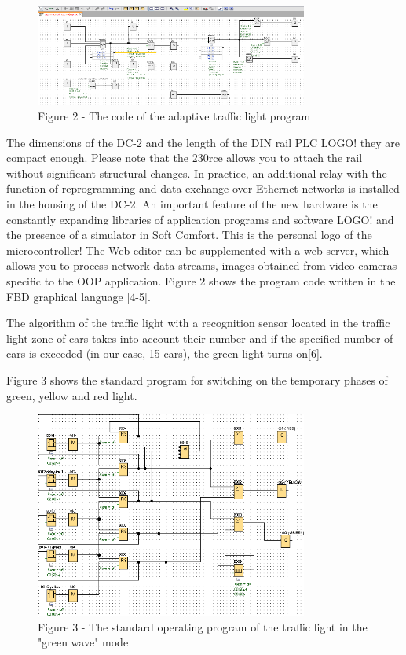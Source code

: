 \begin{figure}[H]
	\centering
	\includegraphics[width=0.8\textwidth]{media/ict/image6}
	\caption*{Figure 2 - The code of the adaptive traffic light program}
\end{figure}

\begin{multicols}{2}
The dimensions of the DC-2 and the length of the DIN rail PLC LOGO! they
are compact enough. Please note that the 230rce allows you to attach the
rail without significant structural changes. In practice, an additional
relay with the function of reprogramming and data exchange over Ethernet
networks is installed in the housing of the DC-2. An important feature
of the new hardware is the constantly expanding libraries of application
programs and software LOGO! and the presence of a simulator in Soft
Comfort. This is the personal logo of the microcontroller! The Web
editor can be supplemented with a web server, which allows you to
process network data streams, images obtained from video cameras
specific to the OOP application. Figure 2 shows the program code written
in the FBD graphical language {[}4-5{]}.

The algorithm of the traffic light with a recognition sensor located in
the traffic light zone of cars takes into account their number and if
the specified number of cars is exceeded (in our case, 15 cars), the
green light turns on{[}6{]}.

Figure 3 shows the standard program for switching on the temporary
phases of green, yellow and red light.
\end{multicols}

\begin{figure}[H]
	\centering
	\includegraphics[width=0.8\textwidth]{media/ict/image7}
	\caption*{Figure 3 - The standard operating program of the traffic light
in the "green wave" mode}
\end{figure}

